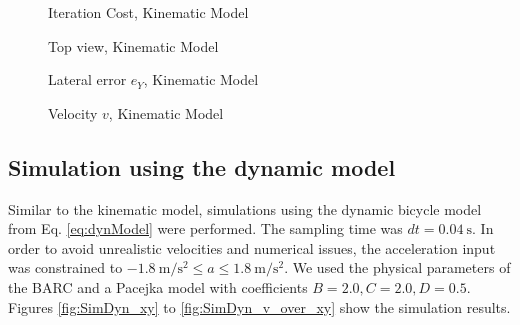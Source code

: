 \begin{figure}[ht]
	\centering
  	
  	\caption{Iteration Cost, Kinematic Model}
	\label{fig:SimKin_cost}
\end{figure}
\begin{figure}[ht]
	\centering
  	
	\caption{Top view, Kinematic Model}
	\label{fig:SimKin_xy}
\end{figure}
\begin{figure}[ht]
	\centering
  	
  	\caption{Lateral error $e_Y$, Kinematic Model}
	\label{fig:SimKin_eY}
\end{figure}
\begin{figure}[ht]
	\centering
  	
  	\caption{Velocity $v$, Kinematic Model}
	\label{fig:SimKin_v}
\end{figure}

\subsection{Simulation using the dynamic model}
Similar to the kinematic model, simulations using the dynamic bicycle model from Eq. \eqref{eq:dynModel} were performed. The sampling time was $dt=\SI{0.04}{\second}$. In order to avoid unrealistic velocities and numerical issues, the acceleration input was constrained to $-\SI{1.8}{\meter\per\square\second}\leq a \leq \SI{1.8}{\meter\per\square\second}$. We used the physical parameters of the BARC and a Pacejka model with coefficients $B=2.0, C=2.0, D = 0.5$. Figures \ref{fig:SimDyn_xy} to \ref{fig:SimDyn_v_over_xy} show the simulation results.\\
